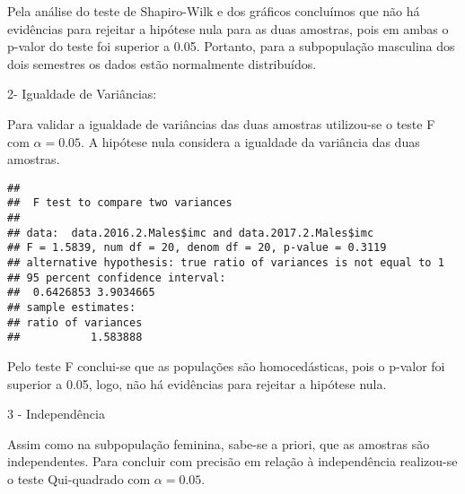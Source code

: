 \documentclass[]{article}
\newenvironment{Shaded}{\begin{snugshade}}{\end{snugshade}}
\newcommand{\DecValTok}[1]{\textcolor[rgb]{0.00,0.00,0.81}{#1}}
\newcommand{\FloatTok}[1]{\textcolor[rgb]{0.00,0.00,0.81}{#1}}
\newcommand{\KeywordTok}[1]{\textcolor[rgb]{0.13,0.29,0.53}{\textbf{#1}}}
\newcommand{\NormalTok}[1]{#1}
\newcommand{\OperatorTok}[1]{\textcolor[rgb]{0.81,0.36,0.00}{\textbf{#1}}}
\newcommand{\StringTok}[1]{\textcolor[rgb]{0.31,0.60,0.02}{#1}}
\begin{document}
Pela análise do teste de Shapiro-Wilk e dos gráficos concluímos que não
há evidências para rejeitar a hipótese nula para as duas amostras, pois
em ambas o p-valor do teste foi superior a 0.05. Portanto, para a
subpopulação masculina dos dois semestres os dados estão normalmente
distribuídos.

2- Igualdade de Variâncias:

Para validar a igualdade de variâncias das duas amostras utilizou-se o
teste F com \(\alpha = 0.05\). A hipótese nula considera a igualdade da
variância das duas amostras.

\begin{Shaded}
\end{Shaded}

\begin{verbatim}
## 
##  F test to compare two variances
## 
## data:  data.2016.2.Males$imc and data.2017.2.Males$imc
## F = 1.5839, num df = 20, denom df = 20, p-value = 0.3119
## alternative hypothesis: true ratio of variances is not equal to 1
## 95 percent confidence interval:
##  0.6426853 3.9034665
## sample estimates:
## ratio of variances 
##           1.583888
\end{verbatim}

Pelo teste F conclui-se que as populações são homocedásticas, pois o
p-valor foi superior a 0.05, logo, não há evidências para rejeitar a
hipótese nula.

3 - Independência

Assim como na subpopulação feminina, sabe-se a priori, que as amostras
são independentes. Para concluir com precisão em relação à independência
realizou-se o teste Qui-quadrado com \(\alpha = 0.05\).

\begin{Shaded}
\end{Shaded}
\end{document}
